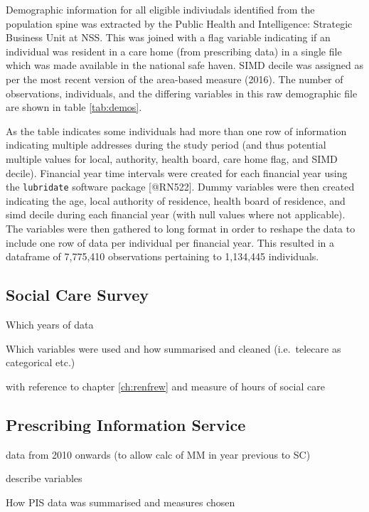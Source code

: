 \documentclass[]{article}
\begin{document}
Demographic information for all eligible indiviudals identified from the
population spine was extracted by the Public Health and Intelligence:
Strategic Business Unit at NSS. This was joined with a flag variable
indicating if an individual was resident in a care home (from
prescribing data) in a single file which was made available in the
national safe haven. SIMD decile was assigned as per the most recent
version of the area-based measure (2016). The number of observations,
individuals, and the differing variables in this raw demographic file
are shown in table \ref{tab:demos}.

As the table indicates some individuals had more than one row of
information indicating multiple addresses during the study period (and
thus potential multiple values for local, authority, health board, care
home flag, and SIMD decile). Financial year time intervals were created
for each financial year using the \texttt{lubridate} software package
{[}@RN522{]}. Dummy variables were then created indicating the age,
local authority of residence, health board of residence, and simd decile
during each financial year (with null values where not applicable). The
variables were then gathered to long format in order to reshape the data
to include one row of data per individual per financial year. This
resulted in a dataframe of 7,775,410 observations pertaining to
1,134,445 individuals.

\FloatBarrier

\subsection{Social Care Survey}\label{subsubsec:scs-summs}

Which years of data

Which variables were used and how summarised and cleaned (i.e.~telecare
as categorical etc.)

with reference to chapter \ref{ch:renfrew} and measure of hours of
social care

\subsection{Prescribing Information Service}\label{subsubsec:pis-summs}

data from 2010 onwards (to allow calc of MM in year previous to SC)

describe variables

How PIS data was summarised and measures chosen
\end{document}

